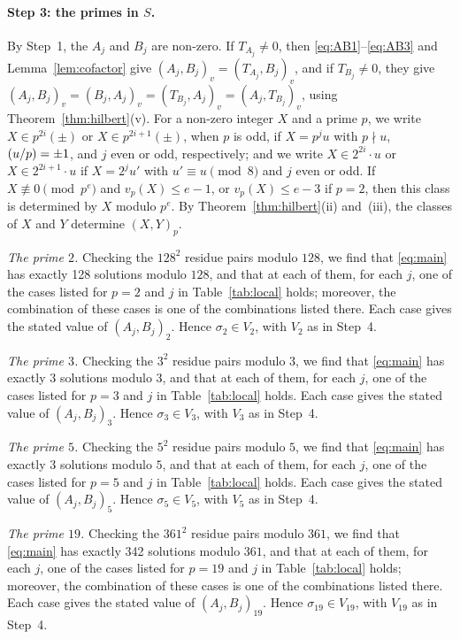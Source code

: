 \documentclass[11pt]{article}
\newcommand{\leg}[2]{\mathchoice{\biggl(\dfrac{#1}{#2}\biggr)}{(#1/#2)}{(#1/#2)}{(#1/#2)}}
\begin{document}
\paragraph{Step 3: the primes in $S$.} By Step~1, the $A_j$ and $B_j$ are non-zero. If $T_{A_j}\neq0$, then \eqref{eq:AB1}--\eqref{eq:AB3} and Lemma~\ref{lem:cofactor} give $(A_j,B_j)_v=(T_{A_j},B_j)_v$, and if $T_{B_j}\neq0$, they give $(A_j,B_j)_v=(B_j,A_j)_v=(T_{B_j},A_j)_v=(A_j,T_{B_j})_v$, using Theorem~\ref{thm:hilbert}(v). For a non-zero integer $X$ and a prime $p$, we write $X\in p^{2i}(\pm)$ or $X\in p^{2i+1}(\pm)$, when $p$ is odd, if $X=p^ju$ with $p\nmid u$, $\leg{u}{p}=\pm1$, and $j$ even or odd, respectively; and we write $X\in2^{2i}\cdot u$ or $X\in2^{2i+1}\cdot u$ if $X=2^ju'$ with $u'\equiv u\pmod 8$ and $j$ even or odd. If $X\not\equiv0\pmod{p^e}$ and $v_p(X)\leq e-1$, or $v_p(X)\leq e-3$ if $p=2$, then this class is determined by $X$ modulo $p^e$. By Theorem~\ref{thm:hilbert}(ii) and~(iii), the classes of $X$ and $Y$ determine $(X,Y)_p$.

\emph{The prime $2$.} Checking the $128^2$ residue pairs modulo $128$, we find that \eqref{eq:main} has exactly 128 solutions modulo $128$, and that at each of them, for each $j$, one of the cases listed for $p=2$ and $j$ in Table~\ref{tab:local} holds; moreover, the combination of these cases is one of the combinations listed there. Each case gives the stated value of $(A_j,B_j)_{2}$. Hence $\sigma_{2}\in V_{2}$, with $V_{2}$ as in Step~4.

\emph{The prime $3$.} Checking the $3^2$ residue pairs modulo $3$, we find that \eqref{eq:main} has exactly 3 solutions modulo $3$, and that at each of them, for each $j$, one of the cases listed for $p=3$ and $j$ in Table~\ref{tab:local} holds. Each case gives the stated value of $(A_j,B_j)_{3}$. Hence $\sigma_{3}\in V_{3}$, with $V_{3}$ as in Step~4.

\emph{The prime $5$.} Checking the $5^2$ residue pairs modulo $5$, we find that \eqref{eq:main} has exactly 3 solutions modulo $5$, and that at each of them, for each $j$, one of the cases listed for $p=5$ and $j$ in Table~\ref{tab:local} holds. Each case gives the stated value of $(A_j,B_j)_{5}$. Hence $\sigma_{5}\in V_{5}$, with $V_{5}$ as in Step~4.

\emph{The prime $19$.} Checking the $361^2$ residue pairs modulo $361$, we find that \eqref{eq:main} has exactly 342 solutions modulo $361$, and that at each of them, for each $j$, one of the cases listed for $p=19$ and $j$ in Table~\ref{tab:local} holds; moreover, the combination of these cases is one of the combinations listed there. Each case gives the stated value of $(A_j,B_j)_{19}$. Hence $\sigma_{19}\in V_{19}$, with $V_{19}$ as in Step~4.
\end{document}
